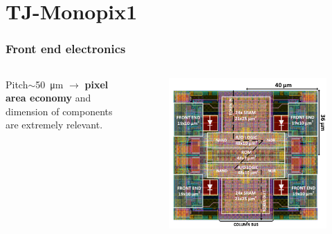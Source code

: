 \section{TJ-Monopix1}
    \begin{frame}[noframenumbering]
        \frametitle{Front end electronics}
            \begin{columns}
                Pitch$\sim$\SI{50}{\um} $\rightarrow$ \textbf{pixel area economy} and dimension of components are extremely relevant. \\\smallskip
                    \begin{figure}[h!]
                        \vspace*{-0.9cm}\hspace*{-0.9cm}
                        \includegraphics[width=1.06\linewidth]{figures/Monopix1/Monopix1_2x2pixelsgroup.png}
                    \end{figure}
            \end{columns}


\end{frame}
